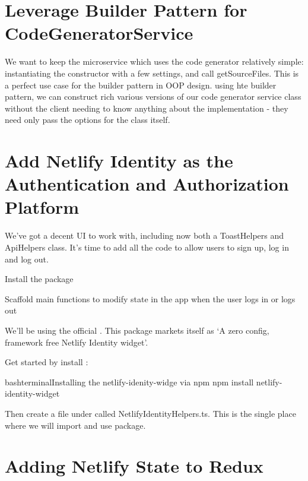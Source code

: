 \documentclass[a4paper,headinclude=on,footinclude=on,12pt,oneside]{scrbook}
\begin{document}
\section{Leverage Builder Pattern for CodeGeneratorService}

We want to keep the microservice which uses the code generator relatively simple: instantiating the constructor with a few settings, and call getSourceFiles. This is a perfect use case for the builder pattern in OOP design. using hte builder pattern, we can construct rich various versions of our code generator service class without the client needing to know anything about the implementation - they need only pass the options for the class itself.

\section{Add Netlify Identity as the Authentication and Authorization Platform}

We've got a decent UI to work with, including now both a ToastHelpers and ApiHelpers class. It's time to add all the code to allow users to sign up, log in and log out. 

\begin{arrows}
\item Install the  package
\item Scaffold main functions to modify state in the app when the user logs in or logs out
\end{arrows}


We'll be using the official . This package markets itself as `A zero config, framework free Netlify Identity widget'. 


Get started by install :

\begin{codeInput}{bash}{terminal}{Installing the netlify-idenity-widge via npm}
npm install netlify-identity-widget
\end{codeInput}

Then create a file under  called NetlifyIdentityHelpers.ts. This is the single place where we will import and use  package.

\section{Adding Netlify State to Redux}
\end{document}
